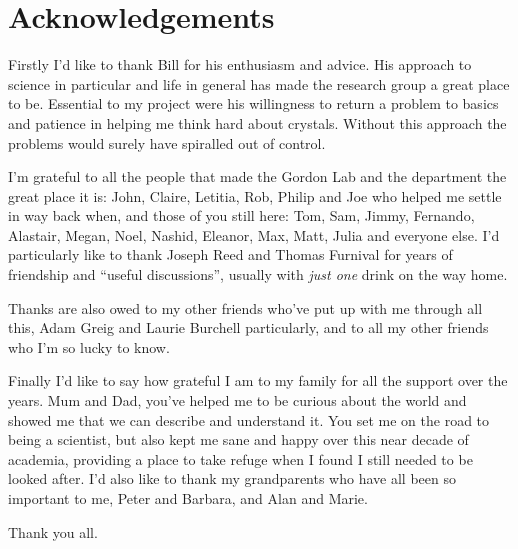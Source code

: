 \clearpage

\doublespacing

\section*{Acknowledgements}


Firstly I'd like to thank Bill for his enthusiasm and advice. His approach to science in particular and life in general has made the research group a great place to be. Essential to my project were his willingness to return a problem to basics and patience in helping me think hard about crystals. Without this approach the problems would surely have spiralled out of control.


I'm grateful to all the people that made the Gordon Lab and the department the great place it is: John, Claire, Letitia, Rob, Philip and Joe who helped me settle in way back when, and those of you still here: Tom, Sam, Jimmy, Fernando, Alastair, Megan, Noel, Nashid, Eleanor, Max, Matt, Julia and everyone else. 
I'd particularly like to thank Joseph Reed and Thomas Furnival for years of friendship and ``useful discussions'', usually with \emph{just one} drink on the way home.

Thanks are also owed to my other friends who've put up with me through all this, Adam Greig and Laurie Burchell particularly, and to all my other friends who I'm so lucky to know.

Finally I'd like to say how grateful I am to my family for all the support over the years.
Mum and Dad, you've helped me to be curious about the world and showed me that we can describe and understand it. You set me on the road to being a scientist, but also kept me sane and happy over this near decade of academia, providing a place to take refuge when I found I still needed to be looked after. I'd also like to thank my grandparents who have all been so important to me, Peter and Barbara, and Alan and Marie.


Thank you all.

























































